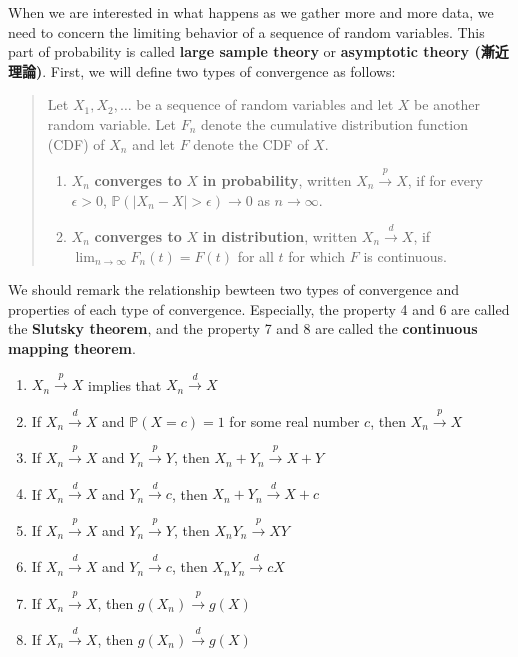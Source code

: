 \documentclass[
  12pt,
]{article}
\providecommand{\tightlist}{%
  \setlength{\itemsep}{0pt}\setlength{\parskip}{0pt}}
\begin{document}
When we are interested in what happens as we gather more and more data,
we need to concern the limiting behavior of a sequence of random
variables. This part of probability is called \textbf{large sample
theory} or \textbf{asymptotic theory (漸近理論)}. First, we will define
two types of convergence as follows:

\begin{quote}
Let \(X_1, X_2, \ldots\) be a sequence of random variables and let \(X\)
be another random variable. Let \(F_n\) denote the cumulative
distribution function (CDF) of \(X_n\) and let \(F\) denote the CDF of
\(X\).

\begin{enumerate}
\def\labelenumi{\arabic{enumi}.}
\tightlist
\item
  \(X_n\) \textbf{converges to} \(X\) \textbf{in probability}, written
  \(X_n \stackrel{p}{\to} X\), if for every \(\epsilon > 0\),
  \(\mathbb{P}(|X_n - X|> \epsilon) \to 0\) as \(n \to \infty\).
\item
  \(X_n\) \textbf{converges to} \(X\) \textbf{in distribution}, written
  \(X_n \stackrel{d}{\to} X\), if \(\lim_{n\to\infty} F_n(t) = F(t)\)
  for all \(t\) for which \(F\) is continuous.
\end{enumerate}
\end{quote}

We should remark the relationship bewteen two types of convergence and
properties of each type of convergence. Especially, the property 4 and 6
are called the \textbf{Slutsky theorem}, and the property 7 and 8 are
called the \textbf{continuous mapping theorem}.

\begin{enumerate}
\def\labelenumi{\arabic{enumi}.}
\tightlist
\item
  \(X_n \stackrel{p}{\to} X\) implies that \(X_n \stackrel{d}{\to} X\)
\item
  If \(X_n \stackrel{d}{\to} X\) and \(\mathbb{P}(X = c) = 1\) for some
  real number \(c\), then \(X_n \stackrel{p}{\to} X\)
\item
  If \(X_n \stackrel{p}{\to} X\) and \(Y_n \stackrel{p}{\to} Y\), then
  \(X_n + Y_n \stackrel{p}{\to} X + Y\)
\item
  If \(X_n \stackrel{d}{\to} X\) and \(Y_n \stackrel{d}{\to} c\), then
  \(X_n + Y_n \stackrel{d}{\to} X + c\)
\item
  If \(X_n \stackrel{p}{\to} X\) and \(Y_n \stackrel{p}{\to} Y\), then
  \(X_n Y_n \stackrel{p}{\to} XY\)
\item
  If \(X_n \stackrel{d}{\to} X\) and \(Y_n \stackrel{d}{\to} c\), then
  \(X_n Y_n \stackrel{d}{\to} cX\)
\item
  If \(X_n \stackrel{p}{\to} X\), then \(g(X_n) \stackrel{p}{\to} g(X)\)
\item
  If \(X_n \stackrel{d}{\to} X\), then \(g(X_n) \stackrel{d}{\to} g(X)\)
\end{enumerate}
\end{document}
